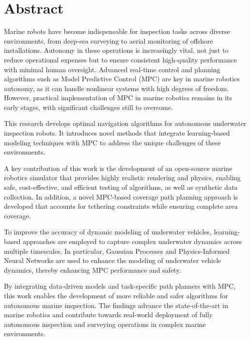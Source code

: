 \chapter*{Abstract}

Marine robots have become indispensable for inspection tasks across diverse environments, from deep-sea surveying to aerial monitoring of offshore installations. Autonomy in these operations is increasingly vital, not just to reduce operational expenses but to ensure consistent high-quality performance with minimal human oversight. Advanced real-time control and planning algorithms such as Model Predictive Control (MPC) are key in marine robotics autonomy, as it can handle nonlinear systems with high degrees of freedom. However, practical implementation of MPC in marine robotics remains in its early stages, with significant challenges still to overcome. 

This research develops optimal navigation algorithms for autonomous underwater inspection robots. It introduces novel methods that integrate learning-based modeling techniques with MPC to address the unique challenges of these environments.

A key contribution of this work is the development of an open-source marine robotics simulator that provides highly realistic rendering and physics, enabling safe, cost-effective, and efficient testing of algorithms, as well as synthetic data collection. In addition, a novel MPC-based coverage path planning approach is developed that accounts for tethering constraints while ensuring complete area coverage.

To improve the accuracy of dynamic modeling of underwater vehicles, learning-based approaches are employed to capture complex underwater dynamics across multiple timescales. In particular, Gaussian Processes and Physics-Informed Neural Networks are used to enhance the modeling of underwater vehicle dynamics, thereby enhancing MPC performance and safety.

By integrating data-driven models and task-specific path planners with MPC, this work enables the development of more reliable and safer algorithms for autonomous marine inspection. The findings advance the state-of-the-art in marine robotics and contribute towards real-world deployment of fully autonomous inspection and surveying operations in complex marine environments.

\newpage

